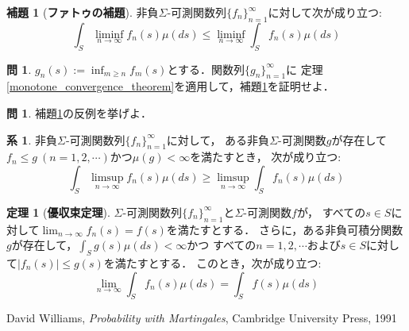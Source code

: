 \documentclass{jsreport}
\theoremstyle{definition}
\newtheorem{lem}[defi]{補題}
\newtheorem{thm}[defi]{定理}
\newtheorem{cor}[defi]{系}
\newtheorem{qst}[defi]{問}
\begin{document}
\begin{lem}[\textbf{ファトゥの補題}]\label{Fatou_lemma}
非負$\Sigma$-可測関数列$\{f_n\}_{n=1}^\infty$に対して次が成り立つ:
\[ \int_S\liminf_{n\to\infty}f_n(s)\mu(ds)\leq\liminf_{n\to\infty}\int_S f_n(s)\mu(ds) \]
\end{lem}

\begin{qst}\label{qst_proof_of_Fatou_lemma}
$g_n(s):=\displaystyle\inf_{m \geq n}f_m(s)$とする．関数列$\{g_n\}_{n=1}^\infty$に
定理\ref{monotone_convergence_theorem}を適用して，補題\ref{Fatou_lemma}を証明せよ．
\end{qst}

\begin{qst}\label{qst_counterexample_of_Fatou_lemma}
補題\ref{Fatou_lemma}の反例を挙げよ．
\end{qst}

\begin{cor}\label{reverse_Fatou_lemma}
非負$\Sigma$-可測関数列$\{f_n\}_{n=1}^\infty$に対して，
ある非負$\Sigma$-可測関数$g$が存在して
$f_n \leq g\ (n=1,2,\cdots)$かつ$\mu(g)<\infty$を満たすとき，
次が成り立つ:
\[ \int_S\limsup_{n\to\infty}f_n(s)\mu(ds)\geq\limsup_{n\to\infty}\int_S f_n(s)\mu(ds) \]
\end{cor}

\begin{thm}[\textbf{優収束定理}]\label{dominated_convergence_theorem}
$\Sigma$-可測関数列$\{f_n\}_{n=1}^\infty$と$\Sigma$-可測関数$f$が，
すべての$s \in S$に対して$\displaystyle\lim_{n\to\infty}f_n(s)=f(s)$を満たすとする．
さらに，ある非負可積分関数$g$が存在して，$\displaystyle\int_Sg(s)\mu(ds)<\infty$かつ
すべての$n=1,2,\cdots$および$s \in S$に対して$|f_n(s)| \leq g(s)$を満たすとする．
このとき，次が成り立つ:
\[ \lim_{n\to\infty}\int_Sf_n(s)\mu(ds)=\int_Sf(s)\mu(ds) \]
\end{thm}


\begin{thebibliography}{9}
\item David Williams, \textit{Probability with Martingales}, Cambridge University Press, 1991
\end{thebibliography}
\end{document}
